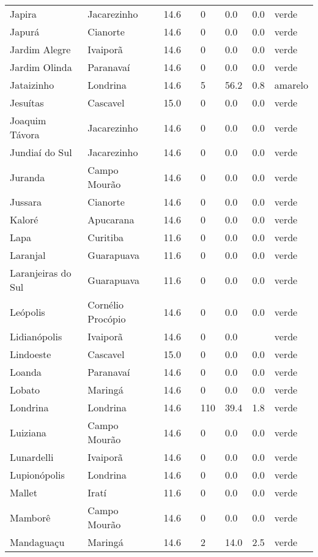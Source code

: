 \begin{longtable}{l|lllllll}
  Japira & Jacarezinho & 14.6 &  & 0 & 0.0 & 0.0 & verde \\ 
  Japurá & Cianorte & 14.6 &  & 0 & 0.0 & 0.0 & verde \\ 
  Jardim Alegre & Ivaiporã & 14.6 &  & 0 & 0.0 & 0.0 & verde \\ 
  Jardim Olinda & Paranavaí & 14.6 &  & 0 & 0.0 & 0.0 & verde \\ 
  Jataizinho & Londrina & 14.6 &  & 5 & 56.2 & 0.8 & amarelo \\ 
  Jesuítas & Cascavel & 15.0 &  & 0 & 0.0 & 0.0 & verde \\ 
  Joaquim Távora & Jacarezinho & 14.6 &  & 0 & 0.0 & 0.0 & verde \\ 
  Jundiaí do Sul & Jacarezinho & 14.6 &  & 0 & 0.0 & 0.0 & verde \\ 
  Juranda & Campo Mourão & 14.6 &  & 0 & 0.0 & 0.0 & verde \\ 
  Jussara & Cianorte & 14.6 &  & 0 & 0.0 & 0.0 & verde \\ 
  Kaloré & Apucarana & 14.6 &  & 0 & 0.0 & 0.0 & verde \\ 
  Lapa & Curitiba & 11.6 &  & 0 & 0.0 & 0.0 & verde \\ 
  Laranjal & Guarapuava & 11.6 &  & 0 & 0.0 & 0.0 & verde \\ 
  Laranjeiras do Sul & Guarapuava & 11.6 &  & 0 & 0.0 & 0.0 & verde \\ 
  Leópolis & Cornélio Procópio & 14.6 &  & 0 & 0.0 & 0.0 & verde \\ 
  Lidianópolis & Ivaiporã & 14.6 &  & 0 & 0.0 &  & verde \\ 
  Lindoeste & Cascavel & 15.0 &  & 0 & 0.0 & 0.0 & verde \\ 
  Loanda & Paranavaí & 14.6 &  & 0 & 0.0 & 0.0 & verde \\ 
  Lobato & Maringá & 14.6 &  & 0 & 0.0 & 0.0 & verde \\ 
  Londrina & Londrina & 14.6 &  & 110 & 39.4 & 1.8 & verde \\ 
  Luiziana & Campo Mourão & 14.6 &  & 0 & 0.0 & 0.0 & verde \\ 
  Lunardelli & Ivaiporã & 14.6 &  & 0 & 0.0 & 0.0 & verde \\ 
  Lupionópolis & Londrina & 14.6 &  & 0 & 0.0 & 0.0 & verde \\ 
  Mallet & Iratí & 11.6 &  & 0 & 0.0 & 0.0 & verde \\ 
  Mamborê & Campo Mourão & 14.6 &  & 0 & 0.0 & 0.0 & verde \\ 
  Mandaguaçu & Maringá & 14.6 &  & 2 & 14.0 & 2.5 & verde \\ 

\end{longtable}
